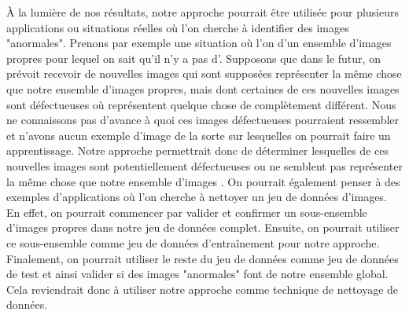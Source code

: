À la lumière de nos résultats, notre approche pourrait être utilisée pour plusieurs applications ou situations réelles où l'on cherche à identifier des images "anormales". Prenons par exemple une situation où l'on \DIFdelbegin {}\DIFdelend \DIFaddbegin {}\DIFaddend d'un ensemble d'images propres pour lequel on sait qu'il n'y a pas d'\DIFdelbegin {}\DIFdelend \DIFaddbegin {}\DIFaddend . Supposons que dans le futur, on prévoit recevoir de nouvelles images qui sont supposées représenter la même chose que notre ensemble d'images propres, mais dont certaines de ces nouvelles images sont défectueuses où représentent quelque chose de complètement différent. Nous ne connaissons pas d'avance à quoi ces images défectueuses pourraient ressembler et n'avons aucun exemple d'image de la sorte sur lesquelles on pourrait faire un apprentissage. Notre approche permettrait donc de déterminer lesquelles de ces nouvelles images sont potentiellement défectueuses ou ne semblent pas représenter la même chose que notre ensemble d'images \DIFdelbegin {}\DIFdelend \DIFaddbegin \textit{}\DIFaddend . On pourrait également penser à des exemples d'applications où l'on cherche à nettoyer un jeu de données d'images. En effet, on pourrait commencer par valider et confirmer un sous-ensemble d'images propres dans notre jeu de données complet. Ensuite, on pourrait utiliser ce sous-ensemble comme jeu de données d'entraînement pour notre approche. Finalement, on pourrait utiliser le reste du jeu de données comme jeu de données de test et ainsi valider si des images "anormales" font \DIFdelbegin {}\DIFdelend \DIFaddbegin {}\DIFaddend de notre ensemble global. Cela reviendrait donc à utiliser notre approche comme technique de nettoyage de données.

